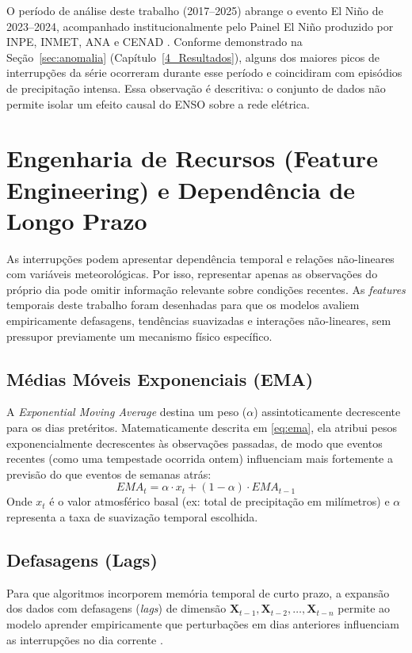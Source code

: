 O período de análise deste trabalho (2017--2025) abrange o evento El Niño de 2023--2024, acompanhado institucionalmente pelo Painel El Niño produzido por INPE, INMET, ANA e CENAD \cite{inpe2023painel}. Conforme demonstrado na Seção~\ref{sec:anomalia} (Capítulo~\ref{4_Resultados}), alguns dos maiores picos de interrupções da série ocorreram durante esse período e coincidiram com episódios de precipitação intensa. Essa observação é descritiva: o conjunto de dados não permite isolar um efeito causal do ENSO sobre a rede elétrica.

\section{Engenharia de Recursos (Feature Engineering) e Dependência de Longo Prazo}
As interrupções podem apresentar dependência temporal e relações não-lineares com variáveis meteorológicas. Por isso, representar apenas as observações do próprio dia pode omitir informação relevante sobre condições recentes. As \textit{features} temporais deste trabalho foram desenhadas para que os modelos avaliem empiricamente defasagens, tendências suavizadas e interações não-lineares, sem pressupor previamente um mecanismo físico específico.

\subsection{Médias Móveis Exponenciais (EMA)}
A \textit{Exponential Moving Average} destina um peso ($\alpha$) assintoticamente decrescente para os dias pretéritos. Matematicamente descrita em \ref{eq:ema}, ela atribui pesos exponencialmente decrescentes às observações passadas, de modo que eventos recentes (como uma tempestade ocorrida ontem) influenciam mais fortemente a previsão do que eventos de semanas atrás:
\begin{equation}
    EMA_t = \alpha \cdot x_t + (1 - \alpha) \cdot EMA_{t-1}
    \label{eq:ema}
\end{equation}
Onde $x_t$ é o valor atmosférico basal (ex: total de precipitação em milímetros) e $\alpha$ representa a taxa de suavização temporal escolhida.

\subsection{Defasagens (Lags)}
Para que algoritmos incorporem memória temporal de curto prazo, a expansão dos dados com defasagens (\textit{lags}) de dimensão $\textbf{X}_{t-1}, \textbf{X}_{t-2}, \dots, \textbf{X}_{t-n}$ permite ao modelo aprender empiricamente que perturbações em dias anteriores influenciam as interrupções no dia corrente \cite{saha2019machine}.


